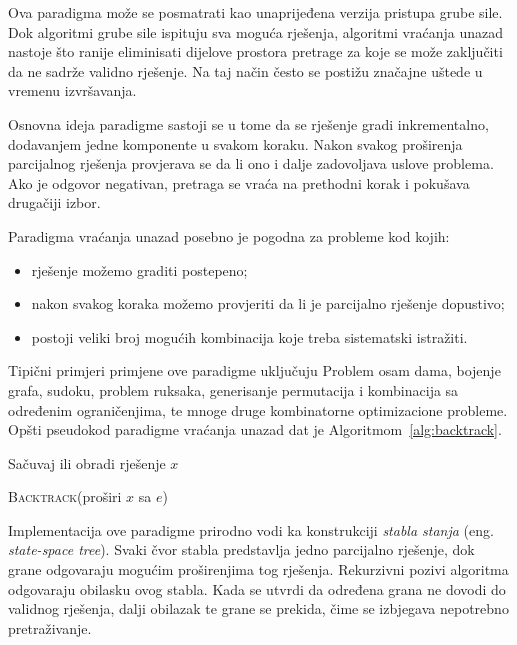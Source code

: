 Ova paradigma može se posmatrati kao unaprijeđena verzija pristupa grube sile. Dok algoritmi grube sile ispituju sva moguća rješenja, algoritmi vraćanja unazad nastoje što ranije eliminisati dijelove prostora pretrage za koje se može zaključiti da ne sadrže validno rješenje. Na taj način često se postižu značajne uštede u vremenu izvršavanja.

Osnovna ideja paradigme sastoji se u tome da se rješenje gradi inkrementalno, dodavanjem jedne komponente u svakom koraku. Nakon svakog proširenja parcijalnog rješenja provjerava se da li ono i dalje zadovoljava uslove problema. Ako je odgovor negativan, pretraga se vraća na prethodni korak i pokušava drugačiji izbor.

Paradigma vraćanja unazad posebno je pogodna za probleme kod kojih:

\begin{itemize}
	\item rješenje možemo graditi postepeno;
	\item nakon svakog koraka možemo provjeriti da li je parcijalno rješenje dopustivo;
	\item postoji veliki broj mogućih kombinacija koje treba sistematski istražiti.
\end{itemize}

Tipični primjeri primjene ove paradigme uključuju Problem osam dama, bojenje grafa, sudoku, problem ruksaka, generisanje permutacija i kombinacija sa određenim ograničenjima, te mnoge druge kombinatorne optimizacione probleme. Opšti pseudokod paradigme vraćanja unazad dat je Algoritmom~\ref{alg:backtrack}.

\begin{algorithm}
	\begin{algorithmic}[1]
		
		\State \Return
		\EndIf
		
		\State Sačuvaj ili obradi rješenje $x$
		\State \Return
		\EndIf
		
		\State \textsc{Backtrack}(proširi $x$ sa $e$)
		\EndFor
		
		\EndProcedure
	\end{algorithmic}
	\caption{Opšti obrazac paradigme vraćanja unazad.}
	\label{alg:backtrack}
\end{algorithm}

Implementacija ove paradigme prirodno vodi ka konstrukciji \textit{stabla stanja} (eng. \emph{state-space tree}). Svaki čvor stabla predstavlja jedno parcijalno rješenje, dok grane odgovaraju mogućim proširenjima tog rješenja. Rekurzivni pozivi algoritma odgovaraju obilasku ovog stabla. Kada se utvrdi da određena grana ne dovodi do validnog rješenja, dalji obilazak te grane se prekida, čime se izbjegava nepotrebno pretraživanje.

